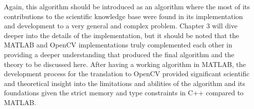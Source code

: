 Again, this algorithm should be introduced as an algorithm where the most of its contributions to the scientific knowledge base were found in its implementation and development to a very general and complex problem. Chapter 3 will dive deeper into the details of the implementation, but it should be noted that the MATLAB\textsuperscript{\textregistered} and OpenCV implementations truly complemented each other in providing a deeper understanding that produced the final algorithm and the theory to be discussed here. After having a working algorithm in MATLAB\textsuperscript{\textregistered}, the development process for the translation to OpenCV provided significant scientific and theoretical insight into the limitations and abilities of the algorithm and its foundations given the strict memory and type constraints in C++ compared to MATLAB\textsuperscript{\textregistered}.




